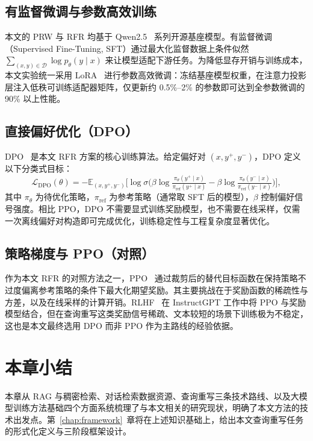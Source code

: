 \subsection{有监督微调与参数高效训练}

本文的 PRW 与 RFR 均基于 Qwen2.5~\citep{qwen2025qwen25technicalreport} 系列开源基座模型。有监督微调（Supervised Fine-Tuning, SFT）通过最大化监督数据上条件似然 $\sum_{(x,y)\in\mathcal{D}} \log p_\theta(y\mid x)$ 来让模型适配下游任务。为降低显存开销与训练成本，本文实验统一采用 LoRA~\citep{lora2022} 进行参数高效微调：冻结基座模型权重，在注意力投影层注入低秩可训练适配器矩阵，仅更新约 0.5\%--2\% 的参数即可达到全参数微调的 90\% 以上性能。

\subsection{直接偏好优化（DPO）}

DPO~\citep{rafailov2023direct} 是本文 RFR 方案的核心训练算法。给定偏好对 $(x, y^+, y^-)$，DPO 定义以下分类式目标：
\begin{equation}
\mathcal{L}_{\text{DPO}}(\theta) = - \mathbb{E}_{(x, y^+, y^-)}\Big[\log \sigma\big(\beta \log\tfrac{\pi_\theta(y^+\mid x)}{\pi_{\text{ref}}(y^+\mid x)} - \beta \log\tfrac{\pi_\theta(y^-\mid x)}{\pi_{\text{ref}}(y^-\mid x)}\big)\Big],
\label{eq:dpo_bg}
\end{equation}
其中 $\pi_\theta$ 为待优化策略，$\pi_{\text{ref}}$ 为参考策略（通常取 SFT 后的模型），$\beta$ 控制偏好信号强度。相比 PPO，DPO 不需要显式训练奖励模型，也不需要在线采样，仅需一次离线偏好对构造即可完成优化，训练稳定性与工程复杂度显著优化。

\subsection{策略梯度与 PPO（对照）}

作为本文 RFR 的对照方法之一，PPO~\citep{schulman2017ppo} 通过裁剪后的替代目标函数在保持策略不过度偏离参考策略的条件下最大化期望奖励。其主要挑战在于奖励函数的稀疏性与方差，以及在线采样的计算开销。RLHF~\citep{ouyang2022traininglanguagemodelsfollow} 在 InstructGPT 工作中将 PPO 与奖励模型结合，但在查询重写这类奖励信号稀疏、文本较短的场景下训练极为不稳定，这也是本文最终选用 DPO 而非 PPO 作为主路线的经验依据。

\section{本章小结}

本章从 RAG 与稠密检索、对话检索数据资源、查询重写三条技术路线、以及大模型训练方法基础四个方面系统梳理了与本文相关的研究现状，明确了本文方法的技术出发点。第~\ref{chap:framework}~章将在上述知识基础上，给出本文查询重写任务的形式化定义与三阶段框架设计。
